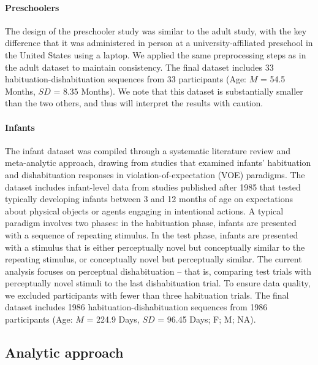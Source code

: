 \documentclass[10pt, letterpaper]{article}
\begin{document}
\hypertarget{preschoolers}{%
\paragraph{Preschoolers}\label{preschoolers}}

The design of the preschooler study was similar to the adult study, with
the key difference that it was administered in person at a
university-affiliated preschool in the United States using a laptop. We
applied the same preprocessing steps as in the adult dataset to maintain
consistency. The final dataset includes 33 habituation-dishabituation
sequences from 33 participants (Age: \(M\) = 54.5 Months, \(SD\) = 8.35
Months). We note that this dataset is substantially smaller than the two
others, and thus will interpret the results with caution.

\hypertarget{infants}{%
\paragraph{Infants}\label{infants}}

The infant dataset was compiled through a systematic literature review
and meta-analytic approach, drawing from studies that examined infants'
habituation and dishabituation responses in violation-of-expectation
(VOE) paradigms. The dataset includes infant-level data from studies
published after 1985 that tested typically developing infants between 3
and 12 months of age on expectations about physical objects or agents
engaging in intentional actions. A typical paradigm involves two phases:
in the habituation phase, infants are presented with a sequence of
repeating stimulus. In the test phase, infants are presented with a
stimulus that is either perceptually novel but conceptually similar to
the repeating stimulus, or conceptually novel but perceptually similar.
The current analysis focuses on perceptual dishabituation -- that is,
comparing test trials with perceptually novel stimuli to the last
dishabituation trial. To ensure data quality, we excluded participants
with fewer than three habituation trials. The final dataset includes
1986 habituation-dishabituation sequences from 1986 participants (Age:
\(M\) = 224.9 Days, \(SD\) = 96.45 Days; F; M; NA).

\hypertarget{analytic-approach}{%
\subsection{Analytic approach}\label{analytic-approach}}
\end{document}
